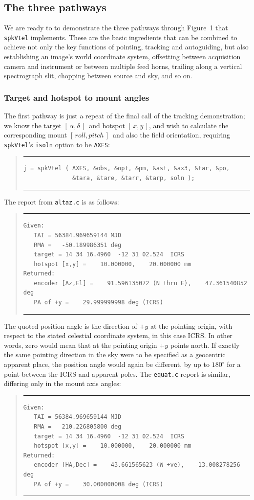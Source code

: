 \documentclass[11pt,fleqn,twoside,\paper]{article}
\renewcommand{\_}{{\tt\char'137}}     %
\newcommand{\radec}     {$[\,\alpha,\delta\,]$}
\newcommand{\ropi}      {$[\,roll,pitch\,]$}
\newcommand{\xy}        {$[\,x,y\,]$}
\newcommand{\degi}[1]   {$#1^{\circ}$}
\newcommand{\scode}     {\goodbreak
                         \begin{quote}
                         \vspace{-6ex}
                         \rule[-2ex]{36em}{0.03ex}}
\newcommand{\ecode}     {\rule[2ex]{36em}{0.03ex}
                         \end{quote}
                         \vspace{-4ex}
                         \goodbreak}
\begin{document}
\subsection{The three pathways}
We are ready to to demonstrate the three pathways through
Figure~1 that {\tt spkVtel} implements.  These are the basic
ingredients that can be combined to achieve not only the key
functions of pointing, tracking and autoguiding, but also
establishing an image's world coordinate system, offsetting
between acquisition camera and instrument or between multiple
feed horns, trailing along a vertical spectrograph slit,
chopping between source and sky, and so on.

\subsubsection{Target and hotspot to mount angles}

The first pathway is just
a repeat of the final call of the tracking
demonstration;  we know the target \radec\ and hotspot \xy,
and wish to calculate the corresponding mount \ropi\ and
also the field orientation,
requiring {\tt spkVtel}'s {\tt isoln} option to be  {\tt AXES}:
\scode\begin{verbatim}
j = spkVtel ( AXES, &obs, &opt, &pm, &ast, &ax3, &tar, &po,
              &tara, &tare, &tarr, &tarp, soln );
\end{verbatim}\ecode
The report from {\tt altaz.c} is as follows:
\scode\begin{verbatim}
Given:
   TAI = 56384.969659144 MJD
   RMA =   -50.189986351 deg
   target = 14 34 16.4960  -12 31 02.524  ICRS
   hotspot [x,y] =    10.000000,    20.000000 mm
Returned:
   encoder [Az,El] =    91.596135072 (N thru E),    47.361540852 deg
   PA of +y =    29.999999998 deg (ICRS)
\end{verbatim}\ecode
The quoted position angle is the direction of $+y$ at
the pointing origin, with respect to the stated celestial
coordinate system, in this case ICRS.  In other words, zero
would mean that at the pointing origin $+y$ points north.
If exactly the same pointing direction in the sky were to be
specified as a geocentric apparent place, the position angle
would again be different, by up to \degi{180} for a point
between the ICRS and apparent poles.  The {\tt equat.c} report
is similar, differing only in the mount axis angles:
\scode\begin{verbatim}
Given:
   TAI = 56384.969659144 MJD
   RMA =   210.226805800 deg
   target = 14 34 16.4960  -12 31 02.524  ICRS
   hotspot [x,y] =    10.000000,    20.000000 mm
Returned:
   encoder [HA,Dec] =    43.661565623 (W +ve),   -13.008278256 deg
   PA of +y =    30.000000008 deg (ICRS)
\end{verbatim}\ecode
\end{document}
